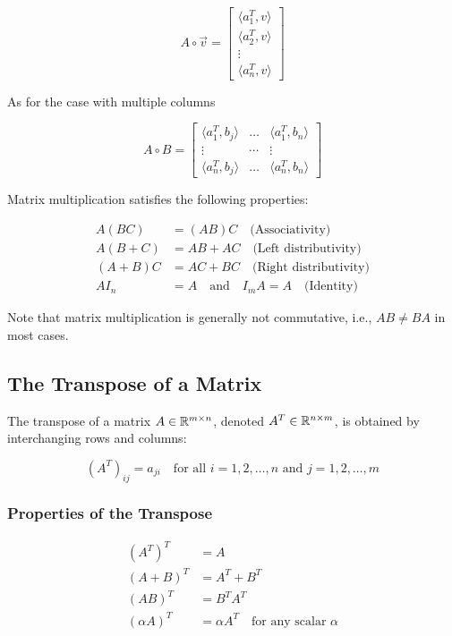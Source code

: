 \[
    A \circ \vec{v} = 
    \begin{bmatrix}
    \langle a_{1}^T, v\rangle \\
    \langle a_{2}^T, v\rangle \\
    \vdots \\
    \langle a_{n}^T, v\rangle 
    \end{bmatrix}
\]

As for the case with multiple columns

\[
    A \circ B = 
    \begin{bmatrix}
    \langle a_{1}^T, b_{j} \rangle & \dots  & \langle a_{1}^T, b_{n} \rangle \\
    \vdots                         & \cdots &              \vdots            \\
    \langle a_{n}^T, b_{j} \rangle & \dots  & \langle a_{n}^T, b_{n} \rangle 
    \end{bmatrix}
\]

Matrix multiplication satisfies the following properties:

\begin{align*}
    A(BC) &= (AB)C \quad \text{(Associativity)} \\
    A(B+C) &= AB + AC \quad \text{(Left distributivity)} \\
    (A+B)C &= AC + BC \quad \text{(Right distributivity)} \\
    AI_n &= A \quad \text{and} \quad I_m A = A \quad \text{(Identity)}
\end{align*}

Note that matrix multiplication is generally not commutative, i.e., \(AB \neq BA\) in most cases.

\subsection{The Transpose of a Matrix}

The transpose of a matrix \(A \in \mathbb{R}^{m \times n}\), denoted \(A^T \in \mathbb{R}^{n \times m}\), is obtained by interchanging rows and columns:

\[
    {(A^T)}_{ij} = a_{ji} \quad \text{for all } i = 1, 2, \ldots, n \text{ and } j = 1, 2, \ldots, m
\]

\subsubsection{Properties of the Transpose}

\begin{align*}
    {(A^T)}^T &= A \\
    {(A + B)}^T &= A^T + B^T \\
    {(AB)}^T &= B^T A^T \\
    {(\alpha A)}^T &= \alpha A^T \quad \text{for any scalar } \alpha
\end{align*}

